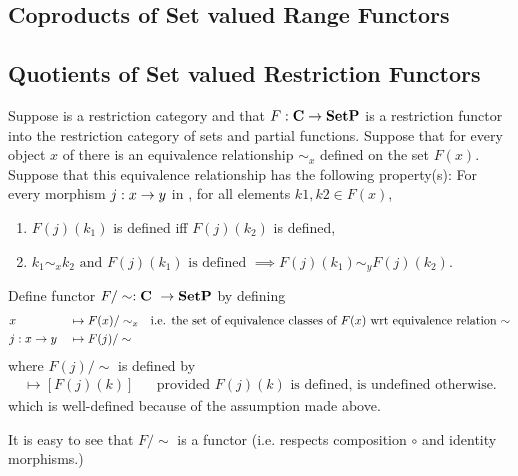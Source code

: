\subsection{Coproducts of Set valued Range Functors}
\subsection{Quotients of Set valued Restriction Functors}

\newcommand{\Fquotient}{F/\sim}
Suppose \catcw is a restriction category and that $F: \textbf{C} \rightarrow \textbf{SetP}$ is a restriction functor into the restriction category of sets and partial functions. Suppose that for every object $x$ of \catcw there is an equivalence relationship $\sim_x$ defined on the set $F(x)$. Suppose that this equivalence relationship has the following property(s):
For every morphism $j:x \rightarrow y$ in \catcw, for all elements $k1,k2 \in F(x)$,
\begin{enumerate}
\item $F(j)(k_1)$ is defined iff $F(j)(k_2)$ is defined, 
\item $k_1 \sim_x k_2 \mbox{ and } F(j)(k_1) \mbox{ is defined } \implies F(j)(k_1) \sim_y F(j)(k_2).$
\end{enumerate}
Define functor $\Fquotient: \catcw \morph \SetP$ by defining
\begin{align*}
&x             &&\mapsto F(x)/\sim_x 
                & \mbox{i.e. the set of equivalence classes of $F(x)$ wrt equivalence relation $\sim$}\\
&j: x \rightarrow y &&\mapsto F(j)/\sim
\end{align*} 
where $F(j)/\sim$ is defined by
\begin{align*}
[k] \mapsto [F(j)(k)] && \mbox{provided $F(j)(k)$ is defined, is undefined otherwise.}
\end{align*}
which is well-defined because of the assumption made above.

It is easy to see that $\Fquotient$ is a functor (i.e. respects composition $\circ$ and identity morphisms.)

